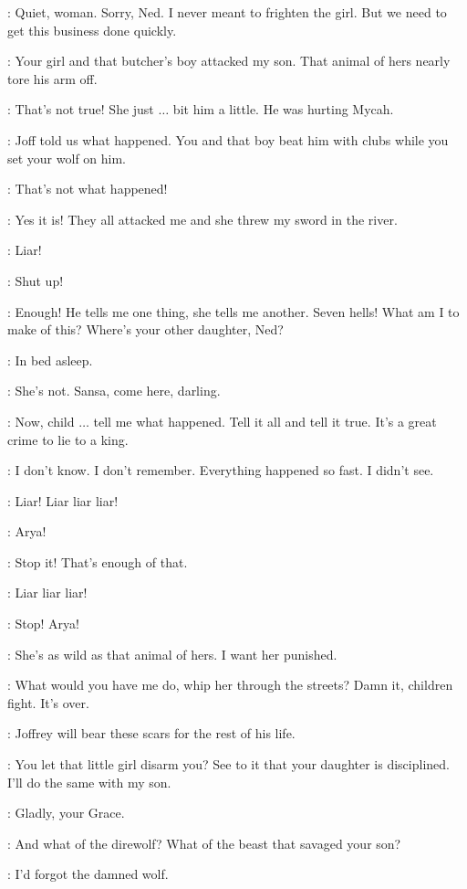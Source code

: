 \ROBERT: Quiet, woman. Sorry, Ned. I never meant to frighten the girl. But we need to get this business done quickly. 

\CERSEI: Your girl and that butcher's boy attacked my son. That animal of hers nearly tore his arm off. 

\ARYA: That's not true! She just $\ldots$ bit him a little. He was hurting Mycah. 

\CERSEI: Joff told us what happened. You and that boy beat him with clubs while you set your wolf on him. 

\ARYA: That's not what happened! 

\JOFFREY: Yes it is! They all attacked me and she threw my sword in the river. 

\ARYA: Liar! 

\JOFFREY: Shut up! 

\ROBERT: Enough! He tells me one thing, she tells me another. Seven hells! What am I to make of this? Where's your other daughter, Ned? 

\NED: In bed asleep. 

\CERSEI: She's not. Sansa, come here, darling. 

\ROBERT: Now, child $\ldots$ tell me what happened. Tell it all and tell it true. It's a great crime to lie to a	king. 

\SANSA: I don't know. I don't remember. Everything happened so fast. I didn't see. 

\ARYA: Liar! Liar liar liar! 

\SANSA: Arya! 

\NED: Stop it! That's enough of that. 

\ARYA: Liar liar liar! 

\NED: Stop! Arya! 

\CERSEI: She's as wild as that animal of hers. I want her punished. 

\ROBERT: What would you have me do, whip her through the streets? Damn it, children fight. It's over. 

\CERSEI: Joffrey will bear these scars for the rest of his life. 

\ROBERT: You let that little girl disarm you? See to it that your daughter is disciplined. I'll do the same with my son. 

\NED: Gladly, your Grace. 

\CERSEI: And what of the direwolf? What of the beast that savaged your son? 

\ROBERT: I'd forgot the damned wolf. 

